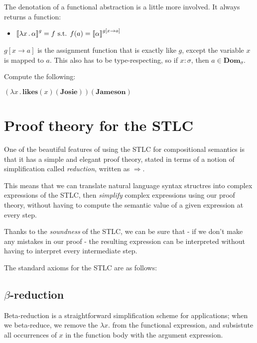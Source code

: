 \documentclass[letterpaper,parskip=half]{scrartcl}
\begin{document}
The denotation of a functional abstraction is a little more involved. It always returns a function:

\begin{itemize}
\item \(\eval*[g]{\lambda x\,.\,\alpha } = f\text{ s.t. }f(a) = \eval*[g[x \to a]]{\alpha }\)
\end{itemize}

\(g[x \to a]\) is the assignment function that is exactly like \(g\), except the variable \(x\) is mapped to \(a\). This also has to be type-respecting, so if \(x: \sigma\), then \(a \in \mathbf{Dom}_{\sigma }\).

Compute the following:

\begin{exe}
\ex \((\lambda x\,.\,\mathbf{likes}(x)(\mathbf{Josie}))(\mathbf{Jameson})\)
\label{org8ee7f9c}
\end{exe}

\section{Proof theory for the STLC}
\label{sec:org0c21f6f}

One of the beautiful features of using the STLC for compositional semantics is that it has a simple and elegant proof theory, stated in terms of a notion of simplification called \emph{reduction}, written as \(\Rightarrow\).

This means that we can translate natural language syntax structres into complex expressions of the STLC, then \emph{simplify} complex expressions using our proof theory, without having to compute the semantic value of a given expression at every step.

Thanks to the \emph{soundness} of the STLC, we can be sure that - if we don't make any mistakes in our proof - the resulting expression can be interpreted without having to interpret every intermediate step.

The standard axioms for the STLC are as follows:

\subsection{\(\beta\)-reduction}
\label{sec:org9a7a0ce}

Beta-reduction is a straightforward simplification scheme for applications; when we beta-reduce, we remove the \(\lambda x.\) from the functional expression, and subsistute all occurrences of \(x\) in the function body with the argument expression. 
\end{document}
